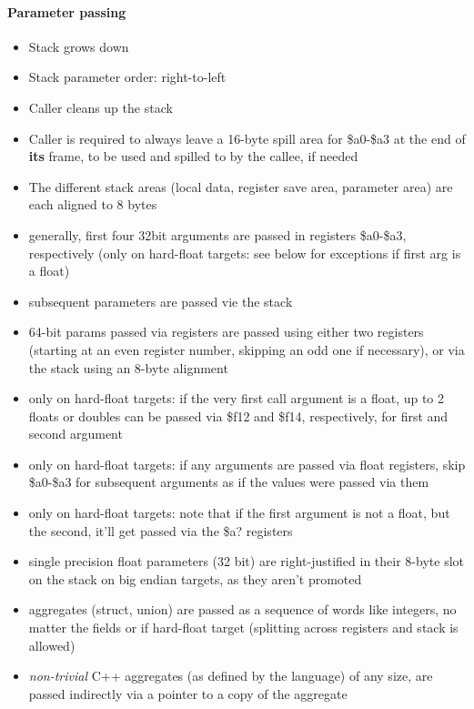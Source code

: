\paragraph{Parameter passing}

\begin{itemize}
\item Stack grows down
\item Stack parameter order: right-to-left
\item Caller cleans up the stack
\item Caller is required to always leave a 16-byte spill area for \$a0-\$a3 at the end of {\bf its} frame, to be used and spilled to by the callee, if needed
\item The different stack areas (local data, register save area, parameter area) are each aligned to 8 bytes
\item generally, first four 32bit arguments are passed in registers \$a0-\$a3, respectively (only on hard-float targets: see below for exceptions if first arg is a float)
\item subsequent parameters are passed vie the stack
\item 64-bit params passed via registers are passed using either two registers (starting at an even register number, skipping an odd one if necessary), or via the stack using an 8-byte alignment
\item only on hard-float targets: if the very first call argument is a float, up to 2 floats or doubles can be passed via \$f12 and \$f14, respectively, for first and second argument
\item only on hard-float targets: if any arguments are passed via float registers, skip \$a0-\$a3 for subsequent arguments as if the values were passed via them
\item only on hard-float targets: note that if the first argument is not a float, but the second, it'll get passed via the \$a? registers
\item single precision float parameters (32 bit) are right-justified in their 8-byte slot on the stack on big endian targets, as they aren't promoted %
\item aggregates (struct, union) are passed as a sequence of words like integers, no matter the fields or if hard-float target (splitting across registers and stack is allowed)
\item {\it non-trivial} C++ aggregates (as defined by the language) of any size, are passed indirectly via a pointer to a copy of the aggregate
\end{itemize}

